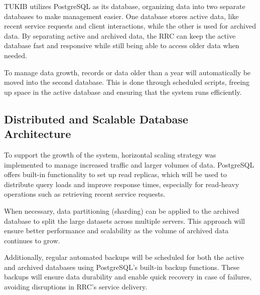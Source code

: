 TUKIB utilizes PostgreSQL as its database, organizing data into two separate databases to make management easier. One database stores active data, like recent service requests and client interactions, while the other is used for archived data. By separating active and archived data, the RRC can keep the active database fast and responsive while still being able to access older data when needed.

To manage data growth, records or data older than a year will automatically be moved into the second database. This is done through scheduled scripts, freeing up space in the active database and ensuring that the system runs efficiently.

\subsection{Distributed and Scalable Database Architecture}

To support the growth of the system, horizontal scaling strategy was implemented to manage increased traffic and larger volumes of data. PostgreSQL offers built-in functionality to set up read replicas, which will be used to distribute query loads and improve response times, especially for read-heavy operations such as retrieving recent service requests.

When necessary, data partitioning (sharding) can be applied to the archived database to split the large datasets across multiple servers. This approach will ensure better performance and scalability as the volume of archived data continues to grow.

Additionally, regular automated backups will be scheduled for both the active and archived databases using PostgreSQL's built-in backup functions. These backups will ensure data durability and enable quick recovery in case of failures, avoiding disruptions in RRC’s service delivery.
